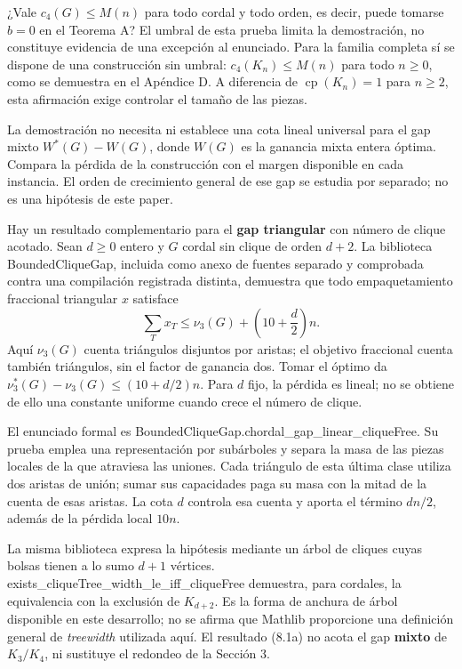 \documentclass[spanish,11pt,a4paper]{article}
\begin{document}
¿Vale \(c_4(G)\le M(n)\) para todo cordal y todo orden, es decir, puede tomarse \(b=0\) en el Teorema A? El umbral de esta prueba limita la demostración, no constituye evidencia de una excepción al enunciado. Para la familia completa sí se dispone de una construcción sin umbral: \(c_4(K_n)\le M(n)\) para todo \(n\ge0\), como se demuestra en el Apéndice D. A diferencia de \(\operatorname{cp}(K_n)=1\) para \(n\ge2\), esta afirmación exige controlar el tamaño de las piezas.

La demostración no necesita ni establece una cota lineal universal para el gap mixto \(W^*(G)-W(G)\), donde \(W(G)\) es la ganancia mixta entera óptima. Compara la pérdida de la construcción con el margen disponible en cada instancia. El orden de crecimiento general de ese gap se estudia por separado; no es una hipótesis de este paper.

Hay un resultado complementario para el \textbf{gap triangular} con número de clique acotado. Sean \(d\ge0\) entero y \(G\) cordal sin clique de orden \(d+2\). La biblioteca {\ttfamily\small BoundedCliqu\discretionary{\hbox{\ensuremath{\hookrightarrow}}}{}{}eGap}, incluida como anexo de fuentes separado y comprobada contra una compilación registrada distinta, demuestra que todo empaquetamiento fraccional triangular \(x\) satisface \[
\sum_T x_T\le \nu_3(G)+\left(10+\frac d2\right)n.
\tag{8.1a}
\] Aquí \(\nu_3(G)\) cuenta triángulos disjuntos por aristas; el objetivo fraccional cuenta también triángulos, sin el factor de ganancia dos. Tomar el óptimo da \(\nu_3^*(G)-\nu_3(G)\le(10+d/2)n\). Para \(d\) fijo, la pérdida es lineal; no se obtiene de ello una constante uniforme cuando crece el número de clique.

El enunciado formal es {\ttfamily\small BoundedCliqu\discretionary{\hbox{\ensuremath{\hookrightarrow}}}{}{}eGap.\discretionary{\hbox{\ensuremath{\hookrightarrow}}}{}{}chordal\_\discretionary{\hbox{\ensuremath{\hookrightarrow}}}{}{}gap\_\discretionary{\hbox{\ensuremath{\hookrightarrow}}}{}{}linear\_\discretionary{\hbox{\ensuremath{\hookrightarrow}}}{}{}cliqueFree}. Su prueba emplea una representación por subárboles y separa la masa de las piezas locales de la que atraviesa las uniones. Cada triángulo de esta última clase utiliza dos aristas de unión; sumar sus capacidades paga su masa con la mitad de la cuenta de esas aristas. La cota \(d\) controla esa cuenta y aporta el término \(dn/2\), además de la pérdida local \(10n\).

La misma biblioteca expresa la hipótesis mediante un árbol de cliques cuyas bolsas tienen a lo sumo \(d+1\) vértices. {\ttfamily\small exists\_\discretionary{\hbox{\ensuremath{\hookrightarrow}}}{}{}cliqueTree\_\discretionary{\hbox{\ensuremath{\hookrightarrow}}}{}{}width\_\discretionary{\hbox{\ensuremath{\hookrightarrow}}}{}{}le\_\discretionary{\hbox{\ensuremath{\hookrightarrow}}}{}{}iff\_\discretionary{\hbox{\ensuremath{\hookrightarrow}}}{}{}cliqueFree} demuestra, para cordales, la equivalencia con la exclusión de \(K_{d+2}\). Es la forma de anchura de árbol disponible en este desarrollo; no se afirma que Mathlib proporcione una definición general de \emph{treewidth} utilizada aquí. El resultado (8.1a) no acota el gap \textbf{mixto} de \(K_3/K_4\), ni sustituye el redondeo de la Sección 3.
\end{document}
